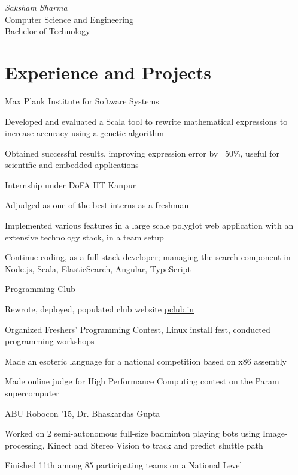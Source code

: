 \documentclass{tccv}
\begin{document}
{ \textit{Saksham \textcolor{myred}{Sharma}}}
\medskip\\
\large{Computer Science and Engineering}\\
\large{Bachelor of Technology}

\vspace{0.1cm}
\section{Experience and Projects}

\begin{experience}

  {Max Plank Institute for Software Systems}
  {
  \item Developed and evaluated a Scala tool to rewrite
    mathematical expressions to increase accuracy using a genetic
    algorithm
  \item Obtained successful results, improving expression error by
    ~50\%, useful for scientific and embedded applications
  }

  {Internship under DoFA IIT Kanpur}
  {
  \item Adjudged as one of the best interns as a freshman
  \item Implemented various features in a large scale polyglot web
    application with an extensive technology stack, in a team setup
  \item Continue coding, as a full-stack developer;
    managing the search component in Node.js, Scala, ElasticSearch,
    Angular, TypeScript
  }

  {Programming Club}
  {
  \item Rewrote, deployed, populated club website \href{http://pclub.in}{pclub.in}
  \item Organized Freshers' Programming Contest, Linux install fest, conducted
    programming workshops
  }

  {
  \item Made an esoteric language for a national
    competition based on x86 assembly
  \item Made online judge for High Performance Computing contest
    on the Param supercomputer
  }

  {ABU Robocon '15, Dr. Bhaskardas Gupta}
  {
  \item Worked on 2 semi-autonomous full-size badminton playing bots
  using Image-processing, Kinect and Stereo Vision to track and
    predict shuttle path
  \item Finished 11th among 85 participating teams on a National Level
  }


\end{experience}
\end{document}
